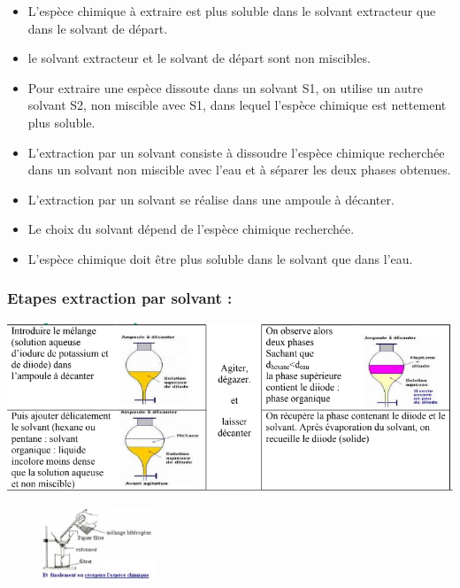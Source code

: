 \documentclass[12pt]{article}
\begin{document}
\begin{itemize}
	\item L’espèce chimique à extraire est plus soluble dans le solvant extracteur que dans le solvant de départ.
	\item  le solvant extracteur et le solvant de départ sont non miscibles.

	\item Pour extraire une espèce dissoute dans un solvant S1, on utilise un autre solvant S2, non miscible avec S1, dans
lequel l’espèce chimique est nettement plus soluble.
\item  L’extraction par un solvant consiste à dissoudre l’espèce chimique recherchée dans un solvant non miscible
avec l’eau et à séparer les deux phases obtenues.
\item L’extraction par un solvant se réalise dans une ampoule à décanter.
\item Le choix du solvant dépend de l’espèce chimique recherchée.
\item  L’espèce chimique doit être plus soluble dans le solvant que dans l’eau.
\end{itemize}
\subsubsection{Etapes extraction par solvant :}

\begin{center}
	\includegraphics[width=1\textwidth]{./img/Extraction_03.png}
\end{center}

\begin{figure}

\vspace{-1cm}
	\includegraphics[width=0.3\textwidth]{./img/Extraction_04.png}
\end{figure}
\end{document}
